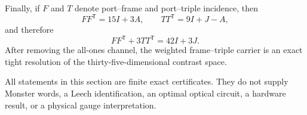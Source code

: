 Finally, if $F$ and $T$ denote port--frame and port--triple incidence, then
\[
 FF^{\mathsf T}=15I+3A,\qquad TT^{\mathsf T}=9I+J-A,
\]
and therefore
\[
 \boxed{FF^{\mathsf T}+3TT^{\mathsf T}=42I+3J}.
\]
After removing the all-ones channel, the weighted frame--triple carrier is an
exact tight resolution of the thirty-five-dimensional contrast space.

All statements in this section are finite exact certificates. They do not
supply Monster words, a Leech identification, an optimal optical circuit, a
hardware result, or a physical gauge interpretation.
